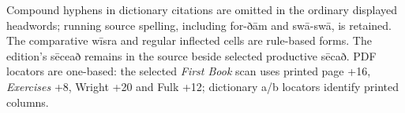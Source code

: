 Compound hyphens in dictionary citations are omitted in the ordinary displayed headwords; running source spelling, including for-ðām and swā-swā, is retained. The comparative wīsra and regular inflected cells are rule-based forms. The edition’s sēceað remains in the source beside selected productive sēcað. PDF locators are one-based: the selected \emph{First Book} scan uses printed page +16, \emph{Exercises} +8, Wright +20 and Fulk +12; dictionary a/\allowbreak{}b locators identify printed columns.

\endgroup

\par\label{end-ch09-learner}
\clearpage\endgroup

